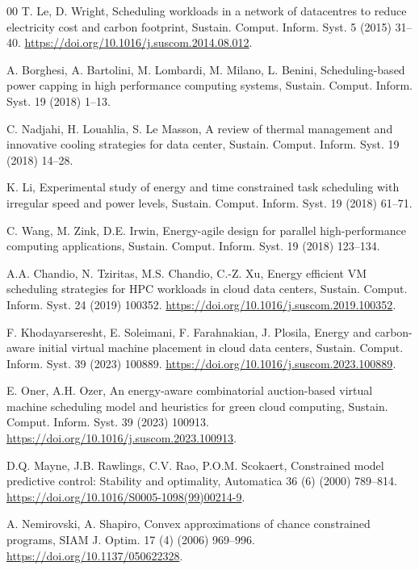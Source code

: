 \documentclass[a4paper,fleqn]{cas-dc}
\begin{document}
\begin{thebibliography}{00}
T. Le, D. Wright, Scheduling workloads in a network of datacentres to reduce electricity cost and carbon footprint, Sustain. Comput. Inform. Syst. 5 (2015) 31--40. \url{https://doi.org/10.1016/j.suscom.2014.08.012}.

A. Borghesi, A. Bartolini, M. Lombardi, M. Milano, L. Benini, Scheduling-based power capping in high performance computing systems, Sustain. Comput. Inform. Syst. 19 (2018) 1--13.

C. Nadjahi, H. Louahlia, S. Le Masson, A review of thermal management and innovative cooling strategies for data center, Sustain. Comput. Inform. Syst. 19 (2018) 14--28.

K. Li, Experimental study of energy and time constrained task scheduling with irregular speed and power levels, Sustain. Comput. Inform. Syst. 19 (2018) 61--71.

C. Wang, M. Zink, D.E. Irwin, Energy-agile design for parallel high-performance computing applications, Sustain. Comput. Inform. Syst. 19 (2018) 123--134.

A.A. Chandio, N. Tziritas, M.S. Chandio, C.-Z. Xu, Energy efficient VM scheduling strategies for HPC workloads in cloud data centers, Sustain. Comput. Inform. Syst. 24 (2019) 100352. \url{https://doi.org/10.1016/j.suscom.2019.100352}.

F. Khodayarseresht, E. Soleimani, F. Farahnakian, J. Plosila, Energy and carbon-aware initial virtual machine placement in cloud data centers, Sustain. Comput. Inform. Syst. 39 (2023) 100889. \url{https://doi.org/10.1016/j.suscom.2023.100889}.

E. Oner, A.H. Ozer, An energy-aware combinatorial auction-based virtual machine scheduling model and heuristics for green cloud computing, Sustain. Comput. Inform. Syst. 39 (2023) 100913. \url{https://doi.org/10.1016/j.suscom.2023.100913}.

D.Q. Mayne, J.B. Rawlings, C.V. Rao, P.O.M. Scokaert, Constrained model predictive control: Stability and optimality, Automatica 36 (6) (2000) 789--814. \url{https://doi.org/10.1016/S0005-1098(99)00214-9}.

A. Nemirovski, A. Shapiro, Convex approximations of chance constrained programs, SIAM J. Optim. 17 (4) (2006) 969--996. \url{https://doi.org/10.1137/050622328}.


\end{thebibliography}
\end{document}
